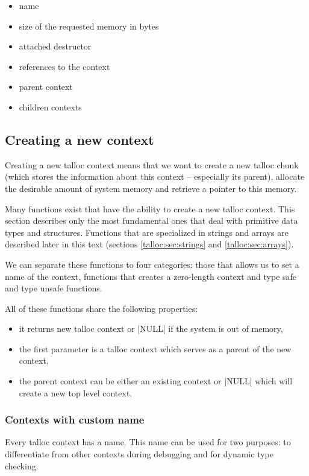 \begin{itemize}
  \item name
  \item size of the requested memory in bytes
  \item attached destructor
  \item references to the context
  \item parent context
  \item children contexts
\end{itemize}

\subsection{Creating a new context}
\label{talloc:subsec:new-context}

Creating a new talloc context means that we want to create a new talloc chunk
(which stores the information about this context -- especially its parent),
allocate the desirable amount of system memory and retrieve a pointer to this
memory.

Many functions exist that have the ability to create a new talloc context. This
section describes only the most fundamental ones that deal with primitive data
types and structures. Functions that are specialized in strings and arrays are
described later in this text (sections \ref{talloc:sec:strings} and
\ref{talloc:sec:arrays}).

We can separate these functions to four categories: those that allows us to
set a name of the context, functions that creates a zero-length context and type
safe and type unsafe functions.

All of these functions share the following properties:
\begin{itemize}
  \item it returns new talloc context or |NULL| if the system is out of memory,
  \item the first parameter is a talloc context which serves as a parent of
  the new context,
  \item the parent context can be either an existing context or |NULL| which
  will create a new top level context.
\end{itemize}

\subsubsection{Contexts with custom name}

Every talloc context has a name. This name can be used for two purposes: to
differentiate from other contexts during debugging and for dynamic type
checking.

